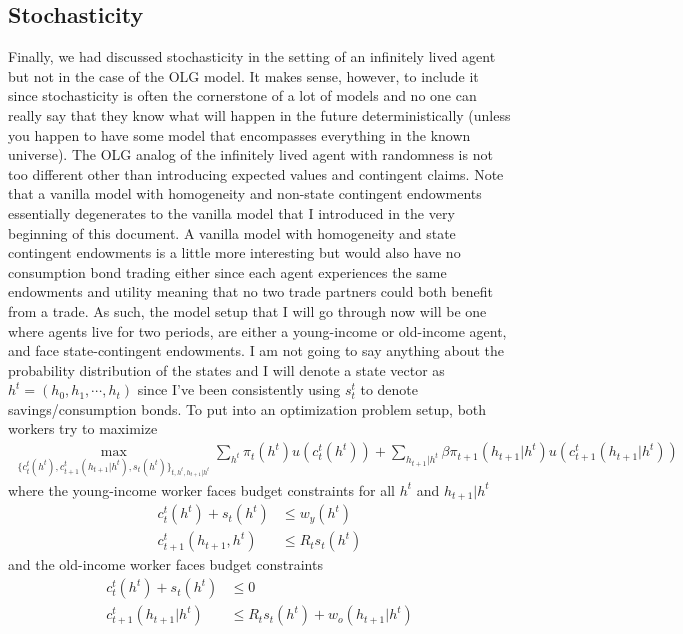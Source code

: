 \documentclass[11pt,english]{article}
\begin{document}
\subsection*{Stochasticity}

Finally, we had discussed stochasticity in the setting of an infinitely lived agent but not in the case of the OLG model. It makes sense, however, to include it since stochasticity is often the cornerstone of a lot of models and no one can really say that they know what will happen in the future deterministically (unless you happen to have some model that encompasses everything in the known universe). The OLG analog of the infinitely lived agent with randomness is not too different other than introducing expected values and contingent claims. Note that a vanilla model with homogeneity and non-state contingent endowments essentially degenerates to the vanilla model that I introduced in the very beginning of this document. A vanilla model with homogeneity and state contingent endowments is a little more interesting but would also have no consumption bond trading either since each agent experiences the same endowments and utility meaning that no two trade partners could both benefit from a trade. As such, the model setup that I will go through now will be one where agents live for two periods, are either a young-income or old-income agent, and face state-contingent endowments. I am not going to say anything about the probability distribution of the states and I will denote a state vector as $h^t = (h_0,h_1,\cdots, h_t)$ since I've been consistently using $s_t^t$ to denote savings/consumption bonds. To put into an optimization problem setup, both workers try to maximize 
\begin{align*}
	\max_{\{c_t^t(h^t), c_{t+1}^t(h_{t+1}|h^t), s_{t}(h^t)\}_{t, h^t, h_{t+1}|h^t} } \sum_{h^t}\pi_t(h^t)u(c_t^t(h^t)) + \sum_{h_{t+1}|h^t} \beta \pi_{t+1}(h_{t+1}|h^t)u(c_{t+1}^t(h_{t+1}|h^t)) 
\end{align*}
where the young-income worker faces budget constraints for all $h^t$ and $h_{t+1}|h^t$
\begin{align*}
	c^t_t(h^t) + s_t(h^t) &\leq w_y(h^t)\\
	c_{t+1}^t(h_{t+1}, h^t) &\leq R_ts_t(h^t)
\end{align*}
and the old-income worker faces budget constraints
\begin{align*}
	c^t_t(h^t) + s_t(h^t) &\leq 0\\
	c_{t+1}^t(h_{t+1}|h^t) &\leq R_ts_t(h^t) + w_o(h_{t+1}|h^t)
\end{align*}
\end{document}
